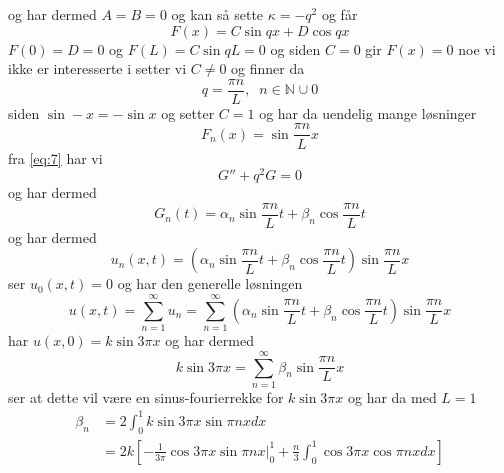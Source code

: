 \documentclass{report}
\newcommand{\M}[2]{\mathbb{#1}^{#2}}
\newcommand{\nbrack}[1]{\left( #1 \right)}
\newcommand{\bbrack}[1]{\left[ #1 \right]}
\begin{document}
og har dermed $A=B=0$ og kan så sette $\kappa = -q^{2}$ og får
\begin{equation}
  \label{eq:11}
  F(x) = C\sin qx + D\cos qx
\end{equation}
$F(0) = D = 0$ og $F(L) = C\sin qL = 0$ og siden $C = 0$ gir $F(x) = 0$ noe vi ikke er interesserte i setter vi $C \neq 0$ og finner da
\begin{equation}
  \label{eq:13}
  q = \frac{\pi n}{L}, \;\; n \in \M{N}{} \cup {0}
\end{equation}
siden $\sin -x = -\sin x$ og setter $C = 1$ og har da uendelig mange løsninger
\begin{equation}
  \label{eq:14}
  F_{n}(x) = \sin \frac{\pi n}{L} x
\end{equation}
fra \eqref{eq:7} har vi
\begin{equation}
  \label{eq:8}
  G'' + q^{2} G = 0
\end{equation}
og har dermed
\begin{equation}
  \label{eq:12}
  G_{n}(t) = \alpha_{n} \sin \frac{\pi n}{L} t + \beta_{n} \cos \frac{\pi n}{L} t
\end{equation}
og har dermed
\begin{equation}
  \label{eq:15}
  u_{n}(x, t) = \nbrack{ \alpha_{n} \sin \frac{\pi n}{L} t + \beta_{n} \cos \frac{\pi n}{L} t } \sin \frac{\pi n}{L} x
\end{equation}
ser $u_{0}(x, t) = 0$ og har den generelle løsningen
\begin{equation}
  \label{eq:16}
  u(x, t) = \sum_{n=1}^{\infty} u_{n} = \sum_{n=1}^{\infty} \nbrack{ \alpha_{n} \sin \frac{\pi n}{L} t + \beta_{n} \cos \frac{\pi n}{L} t } \sin \frac{\pi n}{L} x
\end{equation}
har $u(x, 0) = k\sin 3\pi x$ og har dermed
\begin{equation}
  \label{eq:17}
  k\sin 3\pi x = \sum_{n=1}^{\infty} \beta_{n} \sin \frac{\pi n}{L}x
\end{equation}
ser at dette vil være en sinus-fourierrekke for $k\sin 3\pi x$ og har da med $L = 1$
\begin{equation}
  \label{eq:18}
  \begin{split}
    \beta_{n} &= 2 \int_{0}^{1} k\sin 3\pi x \sin \pi nx dx \\
              &= 2k \bbrack{ -\frac{1}{3\pi} \cos 3\pi x \sin \pi nx \Big|_{0}^{1} + \frac{n}{3} \int_{0}^{1} \cos 3\pi x \cos \pi nx dx } \\
  \end{split}
\end{equation}
\end{document}
